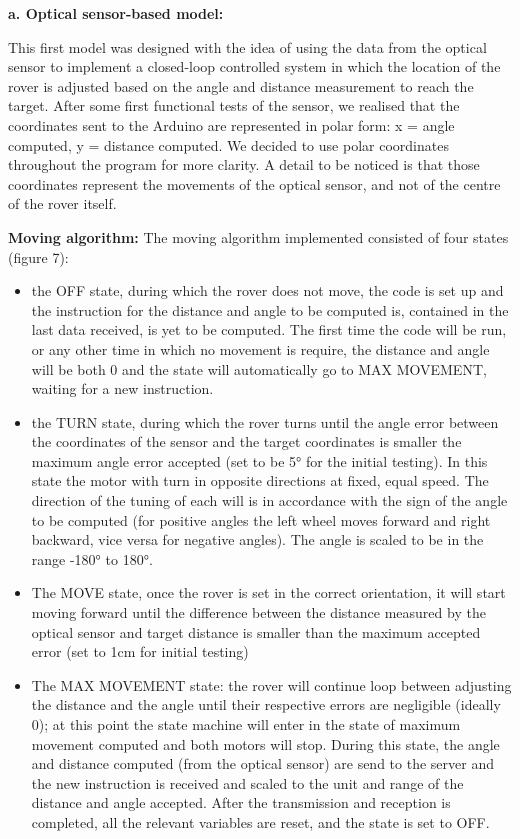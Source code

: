 \documentclass[10pt,twoside]{article}
\begin{document}
\textbf{ a.	Optical sensor-based model:}

This first model was designed with the idea of using the data from the optical sensor to implement a closed-loop controlled system in which the location of the rover is adjusted based on the angle and distance measurement to reach the target. After some first functional tests of the sensor, we realised that the coordinates sent to the Arduino are represented in polar form: x = angle computed, y = distance computed. We decided to use polar coordinates throughout the program for more clarity. A detail to be noticed is that those coordinates represent the movements of the optical sensor, and not of the centre of the rover itself.

\textbf{Moving algorithm:} The moving algorithm implemented consisted of four states (figure 7): 
\begin{itemize}
    \item the OFF state, during which the rover does not move, the code is set up and the instruction for the distance and angle to be computed is, contained in the last data received, is yet to be computed. The first time the code will be run, or any other time in which no movement is require, the distance and angle will be both 0 and the state will automatically go to MAX MOVEMENT, waiting for a new instruction.
	\item the TURN state, during which the rover turns until the angle error between the coordinates of the sensor and the target coordinates is smaller the maximum angle error accepted (set to be 5° for the initial testing). In this state the motor with turn in opposite directions at fixed, equal speed. The direction of the tuning of each will is in accordance with the sign of the angle to be computed (for positive angles the left wheel moves forward and right backward, vice versa for negative angles). The angle is scaled to be in the range -180° to 180°.
	\item The MOVE state, once the rover is set in the correct orientation, it will start moving forward until the difference between the distance measured by the optical sensor and target distance is smaller than the maximum accepted error (set to 1cm for initial testing)
	\item The MAX MOVEMENT state: the rover will continue loop between adjusting the distance and the angle until their respective errors are negligible (ideally 0); at this point the state machine will enter in the state of maximum movement computed and both motors will stop. During this state, the angle and distance computed (from the optical sensor) are send to the server and the new instruction is received and scaled to the unit and range of the distance and angle accepted. After the transmission and reception is completed, all the relevant variables are reset, and the state is set to OFF.
\end{itemize}
\end{document}
